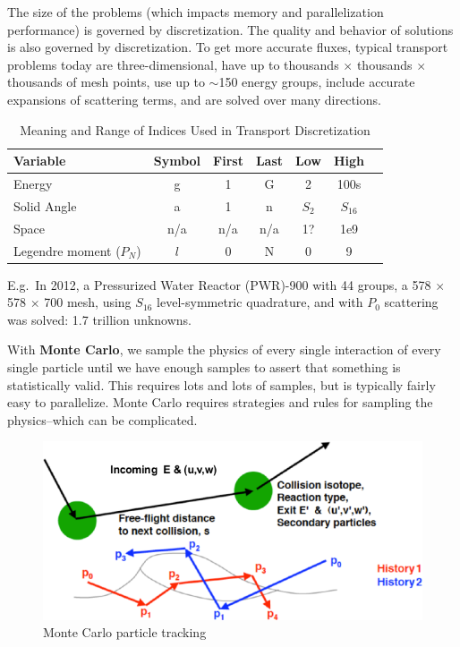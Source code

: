 \documentclass[12pt]{article}
\begin{document}
The size of the problems (which impacts memory and parallelization performance) is governed by discretization. The quality and behavior of solutions is also governed by discretization. To get more accurate fluxes, typical transport problems today are three-dimensional, have up to thousands $\times$ thousands $\times$ thousands of mesh points, use up to $\sim$150 energy groups, include accurate expansions of scattering terms, and are solved over many directions. 
%
\begin{table}[!h]
\caption{Meaning and Range of Indices Used in Transport Discretization}
\begin{center}
\begin{tabular}{l c c c c c c}
\hline
Variable & Symbol & First & Last & Low & High \\[0.5ex]
\hline
Energy & g & 1 & G & 2 & 100s \\
Solid Angle & a & 1 & n & $S_2$ & $S_{16}$ \\
Space & n/a & n/a & n/a & 1? & 1e9 \\
Legendre moment ($P_{N}$) & $l$ & 0 & N & 0 & 9 \\
\hline
\end{tabular}
\end{center}
\label{table:index}
\end{table}

E.g.\ In 2012, a Pressurized Water Reactor (PWR)-900 with 44 groups, a 578 $\times$ 578 $\times$ 700 mesh, using $S_{16}$ level-symmetric quadrature, and with $P_{0}$ scattering was solved: 1.7 trillion unknowns.

With \textbf{Monte Carlo}, we sample the physics of every single interaction of every single particle until we have enough samples to assert that something is statistically valid. This requires lots and lots of samples, but is typically fairly easy to parallelize. Monte Carlo requires strategies and rules for sampling the physics--which can be complicated. 
\begin{figure}[h!]
    \begin{center}
    \includegraphics[keepaspectratio, width = 4 in]{MC}
    \end{center}
    \caption{Monte Carlo particle tracking}
    \label{fig:mc}
\end{figure}
\end{document}
